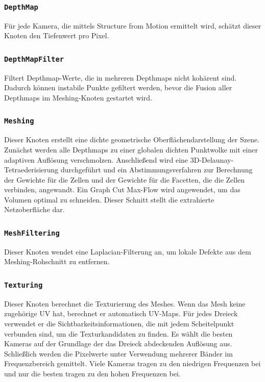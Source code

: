 \documentclass[german,notitlepage,smartquotes]{hgbreport}
\begin{document}
\subsubsection{\texttt{DepthMap}}

Für jede Kamera, die mittels Structure from Motion ermittelt wird, schätzt dieser Knoten den Tiefenwert pro Pixel.

\subsubsection{\texttt{DepthMapFilter}}

Filtert Depthmap-Werte, die in mehreren Depthmaps nicht kohärent sind.
Dadurch können instabile Punkte gefiltert werden, bevor die Fusion aller Depthmaps im Meshing-Knoten gestartet wird.

\subsubsection{\texttt{Meshing}}

Dieser Knoten erstellt eine dichte geometrische Oberflächendarstellung der Szene.
Zunächst werden alle Depthmaps zu einer globalen dichten Punktwolke mit einer adaptiven Auflösung verschmolzen. Anschließend wird eine 3D-Delaunay-Tetraederisierung durchgeführt und ein Abstimmungsverfahren zur Berechnung der Gewichte für die Zellen und der Gewichte für die Facetten, die die Zellen verbinden, angewandt. Ein Graph Cut Max-Flow wird angewendet, um das Volumen optimal zu schneiden. Dieser Schnitt stellt die extrahierte Netzoberfläche dar.

\subsubsection{\texttt{MeshFiltering}}

Dieser Knoten wendet eine Laplacian-Filterung an, um lokale Defekte aus dem Meshing-Rohschnitt zu entfernen.

\subsubsection{\texttt{Texturing}}

Dieser Knoten berechnet die Texturierung des Meshes.
Wenn das Mesh keine zugehörige UV hat, berechnet er automatisch UV-Maps.
Für jedes Dreieck verwendet er die Sichtbarkeitsinformationen, die mit jedem Scheitelpunkt verbunden sind, um die Texturkandidaten zu finden. Es wählt die besten Kameras auf der Grundlage der das Dreieck abdeckenden Auflösung aus. Schließlich werden die Pixelwerte unter Verwendung mehrerer Bänder im Frequenzbereich gemittelt. Viele Kameras tragen zu den niedrigen Frequenzen bei und nur die besten tragen zu den hohen Frequenzen bei.
\end{document}
